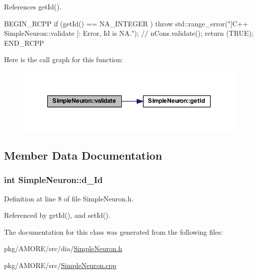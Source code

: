 References getId().


\begin{DoxyCode}
{
  BEGIN_RCPP
  if (getId() == NA_INTEGER ) throw std::range_error("[C++ SimpleNeuron::validate
      ]: Error, Id is NA.");
 // nCons.validate();
  return (TRUE);
END_RCPP}
\end{DoxyCode}


Here is the call graph for this function:\nopagebreak
\begin{figure}[H]
\begin{center}
\leavevmode
\includegraphics[width=354pt]{class_simple_neuron_a9e7173abb892281d0b2ffb0efc82f0e5_cgraph}
\end{center}
\end{figure}




\subsection{Member Data Documentation}
\hypertarget{class_simple_neuron_ad87b0b67c7f8bfe5377313c1e3fac60c}{
\subsubsection[{d\_\-Id}]{\setlength{\rightskip}{0pt plus 5cm}int {\bf SimpleNeuron::d\_\-Id}}}
\label{class_simple_neuron_ad87b0b67c7f8bfe5377313c1e3fac60c}


Definition at line 8 of file SimpleNeuron.h.



Referenced by getId(), and setId().



The documentation for this class was generated from the following files:\begin{DoxyCompactItemize}
\item 
pkg/AMORE/src/dia/\hyperlink{_simple_neuron_8h}{SimpleNeuron.h}\item 
pkg/AMORE/src/\hyperlink{_simple_neuron_8cpp}{SimpleNeuron.cpp}\end{DoxyCompactItemize}
